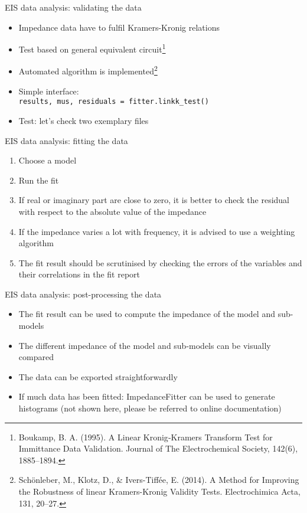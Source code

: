 \documentclass[11pt]{beamer}
\begin{document}
\begin{frame}{EIS data analysis: validating the data}
\begin{itemize}
\item Impedance data have to fulfil Kramers-Kronig relations
\item Test based on general equivalent circuit\footnote{\tiny Boukamp, B. A. (1995). A Linear Kronig‐Kramers Transform Test for Immittance Data Validation. Journal of The Electrochemical Society, 142(6), 1885–1894.}
\item Automated algorithm is implemented\footnote{\tiny Schönleber, M., Klotz, D., \& Ivers-Tiffée, E. (2014). A Method for Improving the Robustness of linear Kramers-Kronig Validity Tests. Electrochimica Acta, 131, 20–27.}
\item Simple interface:\\
\lstinline{results, mus, residuals = fitter.linkk_test()}
\item Test: let's check two exemplary files
\end{itemize}
\end{frame}

\begin{frame}{EIS data analysis: fitting the data}
\begin{enumerate}
\item Choose a model 
\item Run the fit
\item If real or imaginary part are close to zero, it is better to check the residual with respect to the absolute value of the impedance
\item If the impedance varies a lot with frequency, it is advised to use a weighting algorithm
\item The fit result should be scrutinised by checking the errors of the variables and their correlations in the fit report
\end{enumerate}
\end{frame}

\begin{frame}{EIS data analysis: post-processing the data}
\begin{itemize}
\item The fit result can be used to compute the impedance of the model and sub-models
\item The different impedance of the model and sub-models can be visually compared
\item The data can be exported straightforwardly
\item If much data has been fitted: ImpedanceFitter can be used to generate histograms  (not shown here, please be referred to online documentation)
\end{itemize}
\end{frame}
\end{document}
